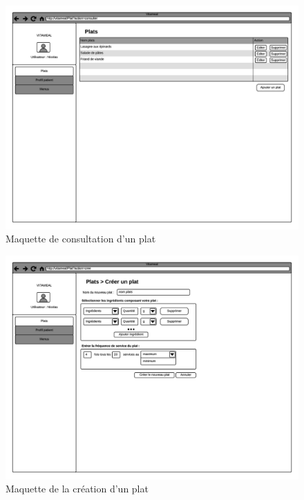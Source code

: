 \begin{figure}
\centering
\includegraphics[scale=0.5]{../../CasDUtilisations/CompositionPlat/maquette_EcranConsulterPlats.png}
\caption{Maquette de consultation d'un plat}
\label{MaquetteConsultationPlat}
\end{figure}

\begin{figure}
\centering
\includegraphics[scale=0.5]{../../CasDUtilisations/CompositionPlat/maquette_EcranCreationPlat.png}
\caption{Maquette de la création d'un plat}
\label{MaquetteCreationPlat}
\end{figure}


